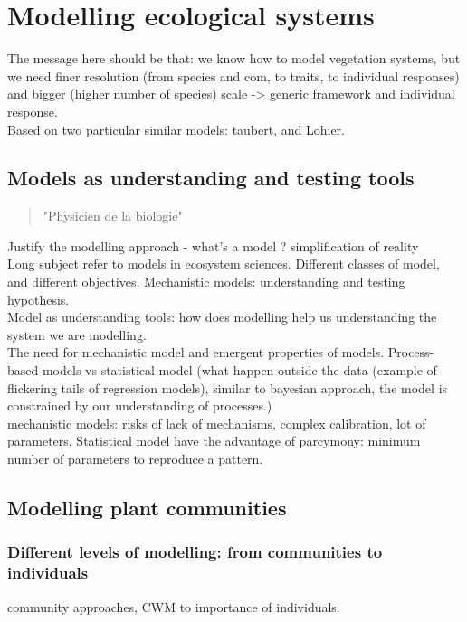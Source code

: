 \chapter{Modelling ecological systems}
The message here should be that: we know how to model vegetation systems, but we need finer resolution (from species and com, to traits, to individual responses) and bigger (higher number of species) scale -> generic framework and individual response.\\
Based on two particular similar models: taubert, and Lohier.

\section{Models as understanding and testing tools}

\begin{quote}
"Physicien de la biologie"
\end{quote}
Justify the modelling approach - what's a model ? simplification of reality\\
Long subject refer to models in ecosystem sciences. Different classes of model, and different objectives. Mechanistic models: understanding and testing hypothesis.\\
Model as understanding tools: how does modelling help us understanding the system we are modelling.\\
The need for mechanistic model and emergent properties of models. Process-based models vs statistical model (what happen outside the data (example of flickering tails of regression models), similar to bayesian approach, the model is constrained by our understanding of processes.) \\
mechanistic models: risks of lack of mechanisms, complex calibration, lot of parameters. Statistical model have the advantage of parcymony: minimum number of parameters to reproduce a pattern.

\section{Modelling plant communities}

\subsection{Different levels of modelling: from communities to individuals}
community approaches, CWM to importance of individuals.\\


